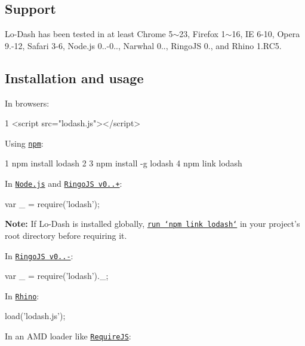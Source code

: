 \subsection*{Support}

Lo-\/\+Dash has been tested in at least Chrome 5$\sim$23, Firefox 1$\sim$16, I\+E 6-\/10, Opera 9.-\/12, Safari 3-\/6, Node.\+js 0..-\/0.., Narwhal 0.., Ringo\+J\+S 0., and Rhino 1.\+R\+C5.

\subsection*{Installation and usage}

In browsers\+:


\begin{DoxyCode}
1 <script src="lodash.js"></script>
\end{DoxyCode}


Using \href{http://npmjs.org/}{\tt npm}\+:


\begin{DoxyCode}
1 npm install lodash
2 
3 npm install -g lodash
4 npm link lodash
\end{DoxyCode}


In \href{http://nodejs.org/}{\tt Node.\+js} and \href{http://ringojs.org/}{\tt Ringo\+J\+S v0..+}\+:


\begin{DoxyCode}
var \_ = require(\textcolor{stringliteral}{'lodash'});
\end{DoxyCode}


{\bfseries Note\+:} If Lo-\/\+Dash is installed globally, \href{http://blog.nodejs.org/2011/03/23/npm-1-0-global-vs-local-installation/}{\tt run `npm link lodash`} in your project’s root directory before requiring it.

In \href{http://ringojs.org/}{\tt Ringo\+J\+S v0..-\/}\+:


\begin{DoxyCode}
var \_ = require(\textcolor{stringliteral}{'lodash'}).\_;
\end{DoxyCode}


In \href{http://www.mozilla.org/rhino/}{\tt Rhino}\+:


\begin{DoxyCode}
load(\textcolor{stringliteral}{'lodash.js'});
\end{DoxyCode}


In an A\+M\+D loader like \href{http://requirejs.org/}{\tt Require\+J\+S}\+:


